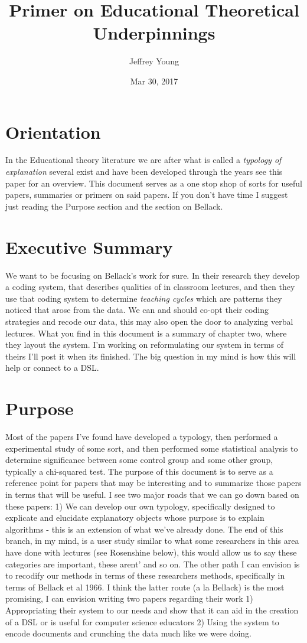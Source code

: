 \documentclass[10pt, letterpaper]{article}
\author{Jeffrey Young}
\date{Mar 30, 2017}
\title{Primer on Educational Theoretical Underpinnings}
\begin{document}
\maketitle

\section*{Orientation}
\label{sec:org5a0ec8e}
In the Educational theory literature we are after what is called a \emph{typology of explanation} several exist and have been developed through the years see this paper \cite{brown1984explaining} for an overview. This document serves as a one stop shop of sorts for useful papers, summaries or primers on said papers. If you don't have time I suggest just reading the Purpose section and the section on Bellack.
\section*{Executive Summary}
\label{sec:org0e31e8c}
We want to be focusing on Bellack's work for sure. In their research they develop a coding system, that describes qualities of in classroom lectures, and then they use that coding system to determine \emph{teaching cycles} which are patterns they noticed that arose from the data. We can and should co-opt their coding strategies and recode our data, this may also open the door to analyzing verbal lectures. What you find in this document is a summary of chapter two, where they layout the system. I'm working on reformulating our system in terms of theirs I'll post it when its finished. The big question in my mind is how this will help or connect to a DSL.

\section*{Purpose}
\label{sec:org461ffc0}
Most of the papers I've found have developed a typology, then performed a experimental study of some sort, and then performed some statistical analysis to determine significance between some control group and some other group, typically a chi-squared test. The purpose of this document is to serve as a reference point for papers that may be interesting and to summarize those papers in terms that will be useful. I see two major roads that we can go down based on these papers: 1) We can develop our own typology, specifically designed to explicate and elucidate explanatory objects whose purpose is to explain algorithms - this is an extension of what we've already done. The end of this branch, in my mind, is a user study similar to what some researchers in this area have done with lectures (see Rosenshine below), this would allow us to say these categories are important, these arent' and so on. The other path I can envision is to recodify our methods in terms of these researchers methods, specifically in terms of Bellack et al 1966. I think the latter route (a la Bellack) is the most promising, I can envision writing two papers regarding their work 1) Appropriating their system to our needs and show that it can aid in the creation of a DSL or is useful for computer science educators 2) Using the system to encode documents and crunching the data much like we were doing.
\end{document}
